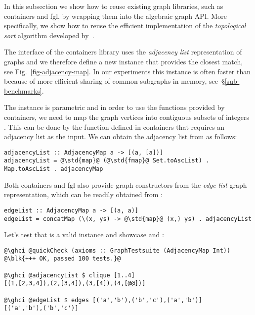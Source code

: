In this subsection we show how to reuse existing graph libraries, such as
\textsf{containers} and \textsf{fgl}, by wrapping them into the algebraic
graph API. More specifically, we show how to reuse the efficient implementation of
the \emph{topological sort} algorithm developed by~\citet{1995_king_graphs}.

The interface of the \textsf{containers} library uses the \emph{adjacency list}
representation of graphs and we therefore define a new  instance that
provides the closest match, see Fig.~\ref{fig-adjacency-map}. In our experiments
this instance is often faster than  because of more efficient
sharing of common subgraphs in memory, see~\S\ref{sub-benchmarks}.

The  instance is parametric and in order to use the
functions provided by \textsf{containers}, we need to map the graph vertices
into contiguous subsets of integers . This can be done by the function
 defined in \textsf{containers} that requires an adjacency list as
the input. We can obtain the adjacency list from  as follows:

\begin{verbatim}
adjacencyList :: AdjacencyMap a -> [(a, [a])]
adjacencyList = @\std{map}@ (@\std{fmap}@ Set.toAscList) . Map.toAscList . adjacencyMap
\end{verbatim}
Both \textsf{containers} and \textsf{fgl} also provide graph constructors from the
\emph{edge list} graph representation, which can be readily obtained from
:

\begin{verbatim}
edgeList :: AdjacencyMap a -> [(a, a)]
edgeList = concatMap (\(x, ys) -> @\std{map}@ (x,) ys) . adjacencyList
\end{verbatim}

\noindent
Let's test that  is a valid  instance and
showcase  and :

\begin{verbatim}
@\ghci @quickCheck (axioms :: GraphTestsuite (AdjacencyMap Int))
@\blk{+++ OK, passed 100 tests.}@

@\ghci @adjacencyList $ clique [1..4]
[(1,[2,3,4]),(2,[3,4]),(3,[4]),(4,[@@])]

@\ghci @edgeList $ edges [('a','b'),('b','c'),('a','b')]
[('a','b'),('b','c')]
\end{verbatim}

